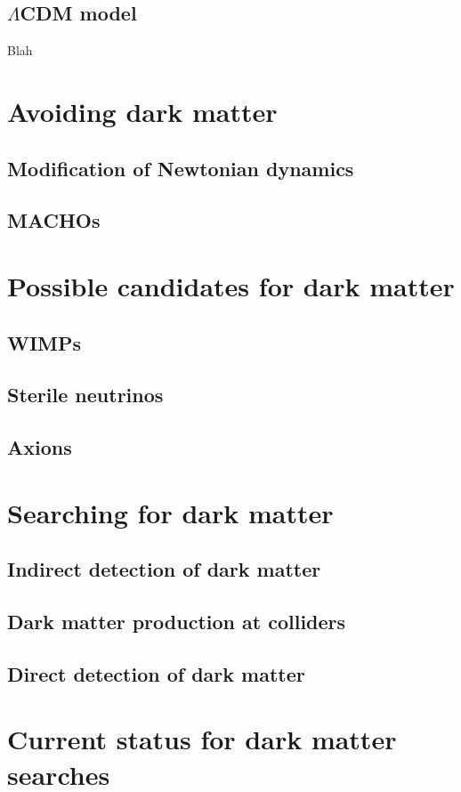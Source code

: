 \subsection{$\Lambda$CDM model}\label{sec:DMOverview/LambdaCDM}
Blah

\section{Avoiding dark matter}\label{sec:DMOverview/AvoidDM}

\subsection{Modification of Newtonian dynamics}\label{sec:DMOverview/MOND}

\subsection{MACHOs}\label{sec:DMOverview/MACHOs}

\section{Possible candidates for dark matter}\label{sec:DMOverview/Candidates4DM}

\subsection{WIMPs}\label{sec:DMOverview/WIMPs}

\subsection{Sterile neutrinos}\label{sec:DMOverview/Neutrinos}

\subsection{Axions}\label{sec:DMOverview/Axions}

\section{Searching for dark matter}\label{sec:DMOverview/DetectionOfDM}

\subsection{Indirect detection of dark matter}\label{sec:DMOverview/IndirectDM}

\subsection{Dark matter production at colliders}\label{sec:DMOverview/DMProdColliders}

\subsection{Direct detection of dark matter}\label{sec:DMOverview/DirectDetection}

\section{Current status for dark matter searches}\label{sec:DMOverview/DMCurrentStatus}